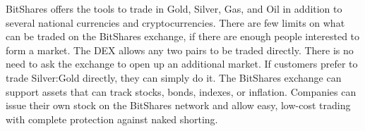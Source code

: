 BitShares offers the tools to trade in Gold, Silver, Gas, and Oil in addition
to several national currencies and cryptocurrencies. There are few limits on
what can be traded on the BitShares exchange, if there are enough people
interested to form a market. The DEX allows any two pairs to be traded
directly. There is no need to ask the exchange to open up an additional market.
If customers prefer to trade Silver:Gold directly, they can simply do it. The
BitShares exchange can support assets that can track stocks, bonds, indexes, or
inflation. Companies can issue their own stock on the BitShares network and
allow easy, low-cost trading with complete protection against naked shorting.
